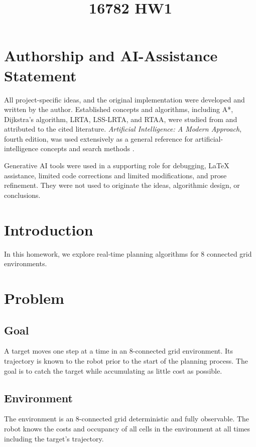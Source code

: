 \documentclass[11pt]{article}
\title{16782 HW1}
\author{}
\date{}
\begin{document}
\maketitle

\section*{Authorship and AI-Assistance Statement}

All project-specific ideas, and the original implementation
were developed and written by the author. Established concepts and algorithms,
including A*, Dijkstra's algorithm, LRTA, LSS-LRTA, and RTAA, were studied from and
attributed to the cited literature. \emph{Artificial Intelligence: A Modern
Approach}, fourth edition, was used extensively as a general reference for
artificial-intelligence concepts and search methods \cite{russell2020aima}.

Generative AI tools were used in a supporting role for debugging, LaTeX
assistance, limited code corrections and limited modifications, and prose
refinement. They were not used to originate the ideas, algorithmic design, or conclusions.

\clearpage
\tableofcontents

\clearpage
\section{Introduction}
In this homework, we explore real-time planning algorithms for 8 connected grid environments.

\section{Problem}
\subsection{Goal}
A target moves one step at a time in an 8-connected grid environment. Its trajectory is known to the robot prior to the start of the planning process. The goal is to catch the target while accumulating as little cost as possible.

\subsection{Environment}
The environment is an 8-connected grid deterministic and fully observable. The robot knows the costs and occupancy of all cells in the environment at all times including the target's trajectory.
\end{document}
